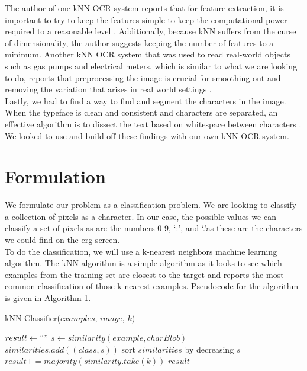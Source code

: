 \documentclass[a4paper,12pt]{article}
\begin{document}
The author of one kNN OCR system reports that for feature extraction, it is important to try to keep the features simple to keep the computational power required to a reasonable level \cite{wang}. Additionally, because kNN suffers from the curse of dimensionality, the author suggests keeping the number of features to a minimum. Another kNN OCR system that was used to read real-world objects such as gas pumps and electrical meters, which is similar to what we are looking to do, reports that preprocessing the image is crucial for smoothing out and removing the variation that arises in real world settings \cite{matei}. \\


Lastly, we had to find a way to find and segment the characters in the image. When the typeface is clean and consistent and characters are separated, an effective algorithm is to dissect the text based on whitespace between characters \cite{casey}. We looked to use and build off these findings with our own kNN OCR system.


\section{Formulation}
We formulate our problem as a classification problem. We are looking to classify a collection of pixels as a character. In our case, the possible values we can classify a set of pixels as are the numbers 0-9, \lq :\rq, and \lq .\rq as these are the characters we could find on the erg screen. \\


To do the classification, we will use a k-nearest neighbors machine learning algorithm. The kNN algorithm is a simple algorithm as it looks to see which examples from the training set are closest to the target and reports the most common classification of those k-nearest examples. Pseudocode for the algorithm is given in Algorithm 1. \\

\begin{algorithm}[h]
{
\caption{kNN Classifier($examples$, $image$, $k$)}
\begin{algorithmic}
  \STATE $result \gets ``"$
      \STATE $s \gets similarity(example, charBlob)$
      \STATE $similarities.add((class, s))$
    \ENDFOR
    \STATE sort $similarities$ by decreasing $s$
    \STATE $result += majority(similarity.take(k))$
  \ENDFOR
  \RETURN $result$
\end{algorithmic}
}
\end{algorithm}
\end{document}

